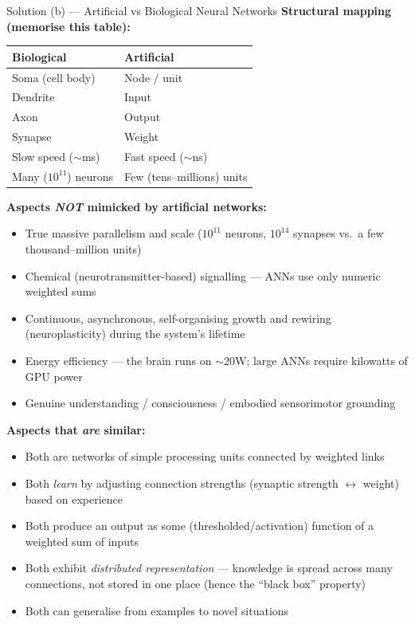\documentclass[12pt,a4paper]{article}
\begin{document}
\begin{solbox}{Solution (b) --- Artificial vs Biological Neural Networks}
\textbf{Structural mapping (memorise this table):}
\begin{center}
\begin{tabular}{ll}
\toprule
\textbf{Biological} & \textbf{Artificial} \\
\midrule
Soma (cell body) & Node / unit \\
Dendrite & Input \\
Axon & Output \\
Synapse & Weight \\
Slow speed ($\sim$ms) & Fast speed ($\sim$ns) \\
Many ($10^{11}$) neurons & Few (tens--millions) units \\
\bottomrule
\end{tabular}
\end{center}

\textbf{Aspects \emph{NOT} mimicked by artificial networks:}
\begin{itemize}[noitemsep]
  \item True massive parallelism and scale ($10^{11}$ neurons, $10^{14}$ synapses vs.\ a few thousand--million units)
  \item Chemical (neurotransmitter-based) signalling --- ANNs use only numeric weighted sums
  \item Continuous, asynchronous, self-organising growth and rewiring (neuroplasticity) during the system's lifetime
  \item Energy efficiency --- the brain runs on $\sim$20W; large ANNs require kilowatts of GPU power
  \item Genuine understanding / consciousness / embodied sensorimotor grounding
\end{itemize}

\textbf{Aspects that \emph{are} similar:}
\begin{itemize}[noitemsep]
  \item Both are networks of simple processing units connected by weighted links
  \item Both \emph{learn} by adjusting connection strengths (synaptic strength $\leftrightarrow$ weight) based on experience
  \item Both produce an output as some (thresholded/activation) function of a weighted sum of inputs
  \item Both exhibit \emph{distributed representation} --- knowledge is spread across many connections, not stored in one place (hence the ``black box'' property)
  \item Both can generalise from examples to novel situations
\end{itemize}
\end{solbox}
\end{document}
